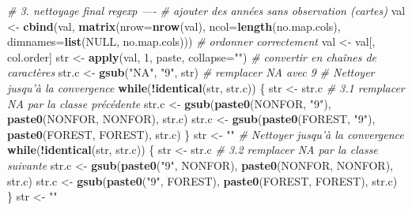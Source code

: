 \documentclass[a4paper, notitlepage, 12pt, krantz2]{krantz}
\newenvironment{Shaded}{\begin{snugshade}}{\end{snugshade}}
\newcommand{\CommentTok}[1]{\textcolor[rgb]{0.56,0.35,0.01}{\textit{#1}}}
\newcommand{\ControlFlowTok}[1]{\textcolor[rgb]{0.13,0.29,0.53}{\textbf{#1}}}
\newcommand{\DataTypeTok}[1]{\textcolor[rgb]{0.13,0.29,0.53}{#1}}
\newcommand{\DecValTok}[1]{\textcolor[rgb]{0.00,0.00,0.81}{#1}}
\newcommand{\KeywordTok}[1]{\textcolor[rgb]{0.13,0.29,0.53}{\textbf{#1}}}
\newcommand{\NormalTok}[1]{#1}
\newcommand{\OperatorTok}[1]{\textcolor[rgb]{0.81,0.36,0.00}{\textbf{#1}}}
\newcommand{\OtherTok}[1]{\textcolor[rgb]{0.56,0.35,0.01}{#1}}
\newcommand{\StringTok}[1]{\textcolor[rgb]{0.31,0.60,0.02}{#1}}
\begin{document}
\begin{Shaded}
\begin{Highlighting}[]
{{{    \CommentTok{# 3. nettoyage final regexp ----}
    \CommentTok{# ajouter des années sans observation (cartes)}
\NormalTok{    val   <-}\StringTok{ }\KeywordTok{cbind}\NormalTok{(val, }\KeywordTok{matrix}\NormalTok{(}\DataTypeTok{nrow=}\KeywordTok{nrow}\NormalTok{(val),                            }
                               \DataTypeTok{ncol=}\KeywordTok{length}\NormalTok{(no.map.cols), }\DataTypeTok{dimnames=}\KeywordTok{list}\NormalTok{(}\OtherTok{NULL}\NormalTok{, no.map.cols)))}
    \CommentTok{# ordonner correctement }
\NormalTok{    val   <-}\StringTok{ }\NormalTok{val[, col.order]                                        }
\NormalTok{    str   <-}\StringTok{ }\KeywordTok{apply}\NormalTok{(val, }\DecValTok{1}\NormalTok{, paste, }\DataTypeTok{collapse=}\StringTok{""}\NormalTok{)           }\CommentTok{# convertir en chaînes de caractères}
\NormalTok{    str.c <-}\StringTok{ }\KeywordTok{gsub}\NormalTok{(}\StringTok{"NA"}\NormalTok{, }\StringTok{"9"}\NormalTok{, str)                        }\CommentTok{# remplacer NA avec 9}
    \CommentTok{# Nettoyer jusqu'à la convergence}
    \ControlFlowTok{while}\NormalTok{(}\OperatorTok{!}\KeywordTok{identical}\NormalTok{(str, str.c)) \{                     }
\NormalTok{      str <-}\StringTok{ }\NormalTok{str.c}
      \CommentTok{# 3.1 remplacer NA par la classe précédente}
\NormalTok{      str.c <-}\StringTok{ }\KeywordTok{gsub}\NormalTok{(}\KeywordTok{paste0}\NormalTok{(NONFOR, }\StringTok{"9"}\NormalTok{), }\KeywordTok{paste0}\NormalTok{(NONFOR, NONFOR), str.c)                   }
\NormalTok{      str.c <-}\StringTok{ }\KeywordTok{gsub}\NormalTok{(}\KeywordTok{paste0}\NormalTok{(FOREST, }\StringTok{"9"}\NormalTok{), }\KeywordTok{paste0}\NormalTok{(FOREST, FOREST), str.c)                }
\NormalTok{    \}}
\NormalTok{    str <-}\StringTok{ ""}
    \CommentTok{# Nettoyer jusqu'à la convergence}
    \ControlFlowTok{while}\NormalTok{(}\OperatorTok{!}\KeywordTok{identical}\NormalTok{(str, str.c)) \{                         }
\NormalTok{      str <-}\StringTok{ }\NormalTok{str.c}
      \CommentTok{# 3.2 remplacer NA par la classe suivante}
\NormalTok{      str.c <-}\StringTok{ }\KeywordTok{gsub}\NormalTok{(}\KeywordTok{paste0}\NormalTok{(}\StringTok{"9"}\NormalTok{, NONFOR), }\KeywordTok{paste0}\NormalTok{(NONFOR, NONFOR), str.c)                   }
\NormalTok{      str.c <-}\StringTok{ }\KeywordTok{gsub}\NormalTok{(}\KeywordTok{paste0}\NormalTok{(}\StringTok{"9"}\NormalTok{, FOREST), }\KeywordTok{paste0}\NormalTok{(FOREST, FOREST), str.c)                }
\NormalTok{    \}}
\NormalTok{    str <-}\StringTok{ ""}
}}}
\end{Highlighting}
\end{Shaded}
\end{document}
